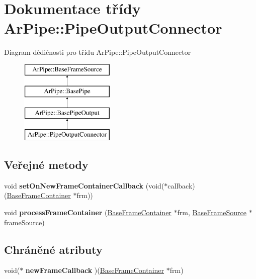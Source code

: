 \hypertarget{class_ar_pipe_1_1_pipe_output_connector}{\section{Dokumentace třídy Ar\-Pipe\-:\-:Pipe\-Output\-Connector}
\label{da/d04/class_ar_pipe_1_1_pipe_output_connector}
}
Diagram dědičnosti pro třídu Ar\-Pipe\-:\-:Pipe\-Output\-Connector\begin{figure}[H]
\begin{center}
\leavevmode
\includegraphics[height=4.000000cm]{da/d04/class_ar_pipe_1_1_pipe_output_connector}
\end{center}
\end{figure}
\subsection*{Veřejné metody}
\begin{DoxyCompactItemize}
\item 
\hypertarget{class_ar_pipe_1_1_pipe_output_connector_af59018bd78eed726aa662ef987ccf516}{void {\bfseries set\-On\-New\-Frame\-Container\-Callback} (void($\ast$callback)(\hyperlink{class_ar_pipe_1_1_base_frame_container}{Base\-Frame\-Container} $\ast$frm))}\label{da/d04/class_ar_pipe_1_1_pipe_output_connector_af59018bd78eed726aa662ef987ccf516}

\item 
\hypertarget{class_ar_pipe_1_1_pipe_output_connector_a00cec41506fb0cdcf2f0f6a215b9b91c}{void {\bfseries process\-Frame\-Container} (\hyperlink{class_ar_pipe_1_1_base_frame_container}{Base\-Frame\-Container} $\ast$frm, \hyperlink{class_ar_pipe_1_1_base_frame_source}{Base\-Frame\-Source} $\ast$frame\-Source)}\label{da/d04/class_ar_pipe_1_1_pipe_output_connector_a00cec41506fb0cdcf2f0f6a215b9b91c}

\end{DoxyCompactItemize}
\subsection*{Chráněné atributy}
\begin{DoxyCompactItemize}
\item 
\hypertarget{class_ar_pipe_1_1_pipe_output_connector_a02c6b01623f4c32967a42abfff1ac456}{void($\ast$ {\bfseries new\-Frame\-Callback} )(\hyperlink{class_ar_pipe_1_1_base_frame_container}{Base\-Frame\-Container} $\ast$frm)}\label{da/d04/class_ar_pipe_1_1_pipe_output_connector_a02c6b01623f4c32967a42abfff1ac456}

\end{DoxyCompactItemize}
